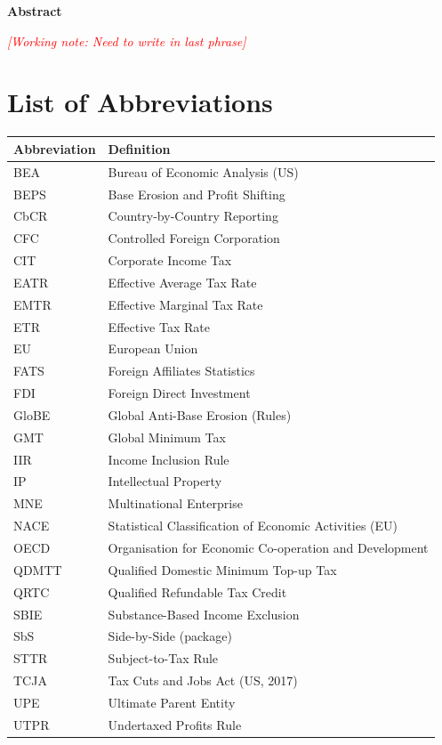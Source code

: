 \documentclass[11pt,a4paper]{article}
\newcommand{\workingnote}[1]{\ifworkingdoc\par\noindent\textcolor{red}{\textit{[Working note: #1]}}\par\fi}
\begin{document}
\newpage
\thispagestyle{plain}
\setcounter{page}{1}

{}
\begin{center}
  {\large\bfseries Abstract}
\end{center}

\noindent

\workingnote{Need to write in last phrase}

\newpage

\tableofcontents

\newpage
\listoftables
\listoffigures

\newpage
{}
{}
\section*{List of Abbreviations}

\begin{tabular}{@{}ll@{}}
  \toprule
  \textbf{Abbreviation} & \textbf{Definition} \\
  \midrule
  BEA & Bureau of Economic Analysis (US) \\
  BEPS & Base Erosion and Profit Shifting \\
  CbCR & Country-by-Country Reporting \\
  CFC & Controlled Foreign Corporation \\
  CIT & Corporate Income Tax \\
  EATR & Effective Average Tax Rate \\
  EMTR & Effective Marginal Tax Rate \\
  ETR & Effective Tax Rate \\
  EU & European Union \\
  FATS & Foreign Affiliates Statistics \\
  FDI & Foreign Direct Investment \\
  GloBE & Global Anti-Base Erosion (Rules) \\
  GMT & Global Minimum Tax \\
  IIR & Income Inclusion Rule \\
  IP & Intellectual Property \\
  MNE & Multinational Enterprise \\
  NACE & Statistical Classification of Economic Activities (EU) \\
  OECD & Organisation for Economic Co-operation and Development \\
  QDMTT & Qualified Domestic Minimum Top-up Tax \\
  QRTC & Qualified Refundable Tax Credit \\
  SBIE & Substance-Based Income Exclusion \\
  SbS & Side-by-Side (package) \\
  STTR & Subject-to-Tax Rule \\
  TCJA & Tax Cuts and Jobs Act (US, 2017) \\
  UPE & Ultimate Parent Entity \\
  UTPR & Undertaxed Profits Rule \\
  \bottomrule
\end{tabular}
\end{document}
